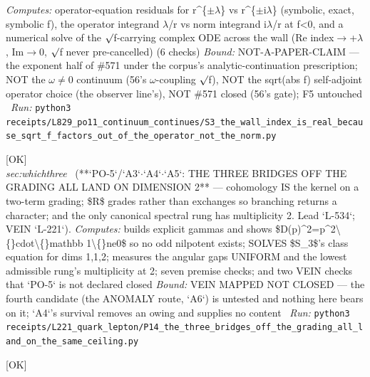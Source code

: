\begin{description}
\emph{Computes:} operator-equation residuals for r\textasciicircum{}\{\ensuremath{\pm}\ensuremath{\lambda}\} vs r\textasciicircum{}\{\ensuremath{\pm}i\ensuremath{\lambda}\} (symbolic, exact, symbolic f), the operator integrand \ensuremath{\lambda}/r vs norm integrand i\ensuremath{\lambda}/r at f<0, and a numerical solve of the \ensuremath{\surd}f-carrying complex ODE across the wall (Re index\ensuremath{\to}+\ensuremath{\lambda}, Im\ensuremath{\to}0, \ensuremath{\surd}f never pre-cancelled) (6 checks)
 \emph{Bound:} NOT-A-PAPER-CLAIM --- the exponent half of \#571 under the corpus's analytic-continuation prescription; NOT the \ensuremath{\omega}\ensuremath{\ne}0 continuum (56's \ensuremath{\omega}-coupling \ensuremath{\surd}f), NOT the sqrt(abs f) self-adjoint operator choice (the observer line's), NOT \#571 closed (56's gate); F5 untouched
\ \emph{Run:} \texttt{python3 receipts/L829\_po11\_continuum\_continues/S3\_the\_wall\_index\_is\_real\_because\_sqrt\_f\_factors\_out\_of\_the\_operator\_not\_the\_norm.py}
\item[\label{rcpt:P14_the_three_bridges_off_the_grading_all_land_on_the_same_ceiling}\textbf{}\quad\texttt{P14\_the\_three\_bridges\_off\_the\_grading\_all\_land\_on\_the\_same\_ceiling}]\hfill\textsf{[OK]}\\
\textit{sec:whichthree} \ (**`PO-5`/`A3`\ensuremath{\cdot}`A4`\ensuremath{\cdot}`A5`: THE THREE BRIDGES OFF THE GRADING ALL LAND ON DIMENSION 2** --- cohomology IS the kernel on a two-term grading; \$R\$ grades rather than exchanges so branching returns a character; and the only canonical spectral rung has multiplicity 2. Lead `L-534`; VEIN `L-221`). 
\emph{Computes:} builds explicit gammas and shows \$D(p)\textasciicircum{}2=p\textasciicircum{}2\textbackslash\{\}cdot\textbackslash\{\}mathbb 1\textbackslash\{\}ne0\$ so no odd nilpotent exists; SOLVES \$S\_3\$'s class equation for dims 1,1,2; measures the angular gaps UNIFORM and the lowest admissible rung's multiplicity at 2; seven premise checks; and two VEIN checks that `PO-5` is not declared closed
 \emph{Bound:} VEIN MAPPED NOT CLOSED --- the fourth candidate (the ANOMALY route, `A6`) is untested and nothing here bears on it; `A4`'s survival removes an owing and supplies no content
\ \emph{Run:} \texttt{python3 receipts/L221\_quark\_lepton/P14\_the\_three\_bridges\_off\_the\_grading\_all\_land\_on\_the\_same\_ceiling.py}
\item[\label{rcpt:B4_the_radial_operator_carries_a_real_structure}\textbf{}\quad\texttt{B4\_the\_radial\_operator\_carries\_a\_real\_structure}]\hfill\textsf{[OK]}\\

\end{description}
